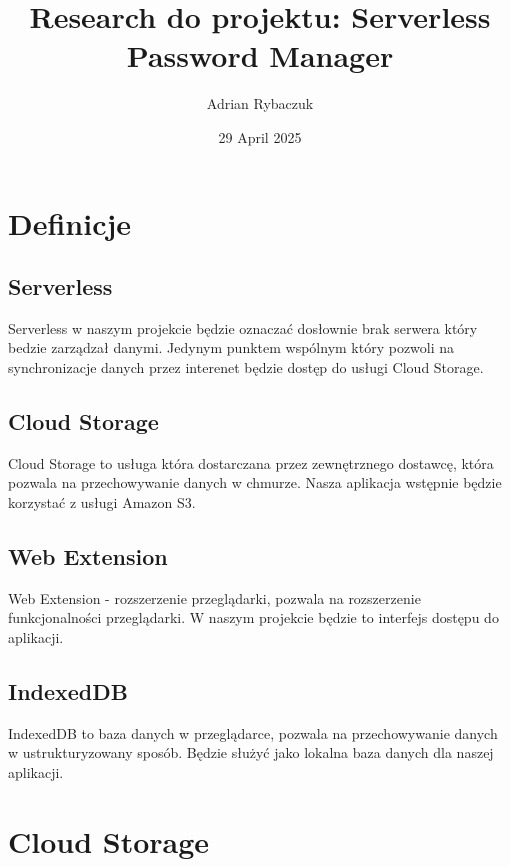 \documentclass[11pt, a4paper]{article}
\begin{document}
\title{Research do projektu: Serverless Password Manager}
\author{Adrian Rybaczuk}
\date{29 April 2025}
\maketitle

\tableofcontents

\newpage

\section{Definicje}
\subsection{Serverless}

Serverless w naszym projekcie będzie oznaczać dosłownie brak serwera który bedzie zarządzał danymi.
Jedynym punktem wspólnym który pozwoli na synchronizacje danych przez interenet będzie dostęp do usługi Cloud Storage.

\subsection{Cloud Storage}

Cloud Storage to usługa która dostarczana przez zewnętrznego dostawcę, która pozwala na przechowywanie danych w chmurze.
Nasza aplikacja wstępnie będzie korzystać z usługi Amazon S3.

\subsection{Web Extension}

Web Extension - rozszerzenie przeglądarki, pozwala na rozszerzenie funkcjonalności przeglądarki. 
W naszym projekcie będzie to interfejs dostępu do aplikacji.

\subsection{IndexedDB}

IndexedDB to baza danych w przeglądarce, pozwala na przechowywanie danych w ustrukturyzowany sposób.
Będzie służyć jako lokalna baza danych dla naszej aplikacji.

\newpage

\section{Cloud Storage}
\end{document}

